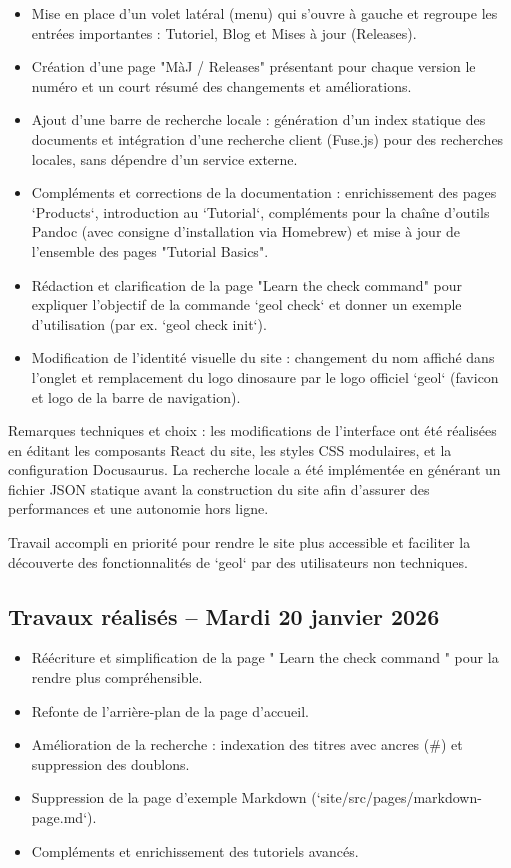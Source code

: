 \documentclass[12pt,a4paper]{report}
\begin{document}
\begin{itemize}
  \item Mise en place d'un volet latéral (menu) qui s'ouvre à gauche et regroupe les entrées importantes : Tutoriel, Blog et Mises à jour (Releases).
  \item Création d'une page "MàJ / Releases" présentant pour chaque version le numéro et un court résumé des changements et améliorations.
  \item Ajout d'une barre de recherche locale : génération d'un index statique des documents et intégration d'une recherche client (Fuse.js) pour des recherches locales, sans dépendre d'un service externe.
  \item Compléments et corrections de la documentation : enrichissement des pages `Products`, introduction au `Tutorial`, compléments pour la chaîne d'outils Pandoc (avec consigne d'installation via Homebrew) et mise à jour de l'ensemble des pages "Tutorial Basics".
  \item Rédaction et clarification de la page "Learn the check command" pour expliquer l'objectif de la commande `geol check` et donner un exemple d'utilisation (par ex. `geol check init`).
  \item Modification de l'identité visuelle du site : changement du nom affiché dans l'onglet et remplacement du logo dinosaure par le logo officiel `geol` (favicon et logo de la barre de navigation).
\end{itemize}

Remarques techniques et choix : les modifications de l'interface ont été réalisées en éditant les composants React du site, les styles CSS modulaires, et la configuration Docusaurus. La recherche locale a été implémentée en générant un fichier JSON statique avant la construction du site afin d'assurer des performances et une autonomie hors ligne.

Travail accompli en priorité pour rendre le site plus accessible et faciliter la découverte des fonctionnalités de `geol` par des utilisateurs non techniques.

\subsection*{Travaux réalisés -- Mardi 20 janvier 2026}
\begin{itemize}
  \item Réécriture et simplification de la page " Learn the check command " pour la rendre plus compréhensible.
  \item Refonte de l'arrière‑plan de la page d'accueil.
  \item Amélioration de la recherche : indexation des titres avec ancres (\#) et suppression des doublons.
  \item Suppression de la page d'exemple Markdown (`site/src/pages/markdown-page.md`).
  \item Compléments et enrichissement des tutoriels avancés.
\end{itemize}
\end{document}
